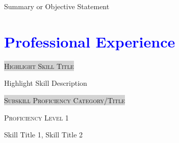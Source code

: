 \documentclass[a4paper, oneside, final]{scrartcl}
\begin{document}
\begin{center}
 
\begin{flushleft}
    \textcolor{orange}{\textsc{\Huge{}}}
\end{flushleft}

    \begin{flushleft}

	\colorbox{liteblue} {
		\parbox {\columnwidth }{ 
		Summary or Objective Statement
	}}

    \end{flushleft}

\section{\textcolor{blue}{Professional Experience}} 

    \begin{flushleft}
        \parbox{\textwidth} {
            \colorbox{LightGrey} {
                \textsc{\small{Highlight Skill Title}}
            }
        } 
    \end{flushleft}

    \begin{flushleft}
        \hspace{2em}
		Highlight Skill Description
    \end{flushleft}

	\parbox{\textwidth} {
	    \colorbox{LightGrey} {
		\textsc{\small{Subskill Proficiency Category/Title}}
	    }
	} 

    \begin{multicols}{2}

		\begin{multicols}{2}
			\begin{flushleft}
				\textsc{Proficiency Level 1}
			\end{flushleft}
			\vspace{12em}

			Skill Title 1, Skill Title 2
		\end{multicols}


\end{multicols}
\end{center}
\end{document}

